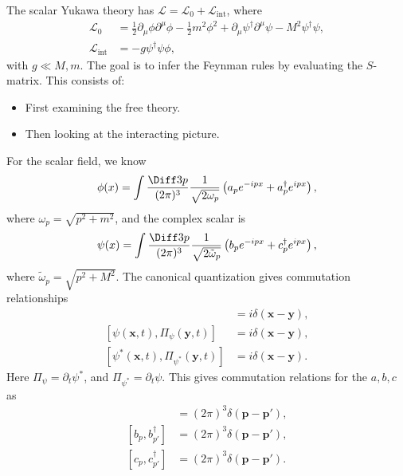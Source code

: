 \documentclass[12pt]{article}
\begin{document}
The scalar Yukawa theory has $\mathcal{L} = \mathcal{L}_0 + \mathcal{L}_{\mathrm{int}}$, where
\begin{align*}
	\mathcal{L}_0 &= \frac{1}{2} \partial_\mu \phi \partial^\mu \phi - \frac{1}{2} m^2 \phi^2 + \partial_\mu \psi^{\dagger} \partial^\mu \psi - M^2 \psi^{\dagger} \psi, \\
	\mathcal{L}_{\mathrm{int}} &= - g \psi^{\dagger} \psi \phi,
\end{align*}
with $g \ll M, m$. The goal is to infer the Feynman rules by evaluating the $S$-matrix. This consists of:
\begin{itemize}
	\item First examining the free theory.
	\item Then looking at the interacting picture.
\end{itemize}

For the scalar field, we know
\[
	\phi(x) = \int \frac{\Diff 3 p}{(2 \pi)^3} \frac{1}{\sqrt{2 \omega_p}} \left( a_p e^{-ipx} + a_p^{\dagger} e^{ipx} \right),
\]
where $\omega_p = \sqrt{p^2 + m^2}$, and the complex scalar is
\[
	\psi(x) = \int \frac{\Diff 3 p}{(2 \pi)^3} \frac{1}{\sqrt{2 \tilde\omega_p}} \left(b_p e^{-ipx} + c_p^{\dagger} e^{ipx}\right),
\]
where $\tilde\omega_p = \sqrt{p^2 + M^2}$. The canonical quantization gives commutation relationships
\begin{align*}
	[\phi(\mathbf{x}, t), \partial_ \phi(\mathbf{y}, t)] &= i \delta(\mathbf{x} - \mathbf{y}), \\
	[\psi(\mathbf{x}, t), \Pi_\psi (\mathbf{y}, t)] &= i \delta(\mathbf{x} - \mathbf{y}), \\
	[\psi^{\ast}(\mathbf{x}, t), \Pi_{\psi^{\ast}}(\mathbf{y}, t)] &= i \delta(\mathbf{x} - \mathbf{y}).
\end{align*}
Here $\Pi_\psi = \partial_t \psi^{\ast}$, and $\Pi_{\psi^{\ast}} = \partial_t \psi$. This gives commutation relations for the $a, b, c$ as
\begin{align*}
	[a_p, a_{p'}^{\dagger}] &= (2 \pi)^3 \delta( \mathbf{p} - \mathbf{p}'), \\
	[b_p, b_{p'}^{\dagger}] &= (2 \pi)^3 \delta( \mathbf{p} - \mathbf{p}'), \\
	[c_p, c_{p'}^{\dagger}] &= (2 \pi)^3 \delta( \mathbf{p} - \mathbf{p}').
\end{align*}
\end{document}
